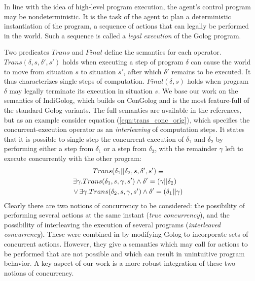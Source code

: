 In line with the idea of high-level program execution, the agent's
control program may be nondeterministic. It is the task of the agent
to plan a deterministic instantiation of the program, a sequence of
actions that can legally be performed in the world. Such a sequence
is called a \emph{legal execution} of the Golog program.

Two predicates $Trans$ and $Final$ define the semantics for each
operator. $Trans(\delta,s,\delta',s')$ holds when executing a step
of program $\delta$ can cause the world to move from situation $s$
to situation $s'$, after which $\delta'$ remains to be executed.
It thus characterizes single steps of computation. $Final(\delta,s)$
holds when program $\delta$ may legally terminate its execution in
situation $s$. We base our work on the semantics of IndiGolog, which
builds on ConGolog and is the most feature-full of the standard Golog
variants. The full semantics are available in the references, but
as an example consider equation (\ref{eqn:trans_conc_orig}), which
specifies the concurrent-execution operator as an \emph{interleaving}
of computation steps. It states that it is possible to single-step
the concurrent execution of $\delta_{1}$ and $\delta_{2}$ by performing
either a step from $\delta_{1}$ or a step from $\delta_{2}$, with
the remainder $\gamma$ left to execute concurrently with the other
program:\begin{multline}
Trans(\delta_{1}||\delta_{2},s,\delta',s')\equiv\\
\shoveright{\exists\gamma.Trans(\delta_{1},s,\gamma,s')\wedge\delta'=(\gamma||\delta_{2})}\\
\vee\,\exists\gamma.Trans(\delta_{2},s,\gamma,s')\wedge\delta'=(\delta_{1}||\gamma)\label{eqn:trans_conc_orig}\end{multline}
 Clearly there are two notions of concurrency to be considered: the
possibility of performing several actions at the same instant (\emph{true
concurrency}), and the possibility of interleaving the execution of
several programs (\emph{interleaved concurrency}). These were combined
in \citet{pinto99tcongolog} by modifying Golog to incorporate sets
of concurrent actions. However, they give a semantics which may call
for actions to be performed that are not possible and which can result
in unintuitive program behavior. A key aspect of our work is a more
robust integration of these two notions of concurrency.

